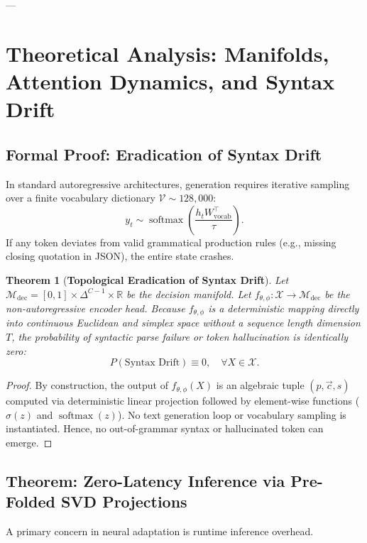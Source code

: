 \documentclass[10pt,journal,compsoc]{IEEEtran}
\newtheorem{theorem}{Theorem}
\theoremstyle{remark}
\begin{document}
---

\section{Theoretical Analysis: Manifolds, Attention Dynamics, and Syntax Drift}

\subsection{Formal Proof: Eradication of Syntax Drift}
In standard autoregressive architectures, generation requires iterative sampling over a finite vocabulary dictionary $\mathcal{V} \sim 128,000$:
\begin{equation}
y_t \sim \operatorname{softmax}\left(\frac{h_t W_{\text{vocab}}^\top}{\tau}\right).
\end{equation}
If any token deviates from valid grammatical production rules (e.g., missing closing quotation in JSON), the entire state crashes.

\begin{theorem}[\textbf{Topological Eradication of Syntax Drift}]
Let $\mathcal{M}_{\text{dec}} = [0, 1] \times \Delta^{C-1} \times \mathbb{R}$ be the decision manifold. Let $f_{\theta, \phi}: \mathcal{X} \to \mathcal{M}_{\text{dec}}$ be the non-autoregressive encoder head. Because $f_{\theta, \phi}$ is a deterministic mapping directly into continuous Euclidean and simplex space without a sequence length dimension $T$, the probability of syntactic parse failure or token hallucination is identically zero:
\begin{equation}
P(\text{Syntax Drift}) \equiv 0, \quad \forall X \in \mathcal{X}.
\end{equation}
\end{theorem}
\begin{proof}
By construction, the output of $f_{\theta, \phi}(X)$ is an algebraic tuple $(p, \vec{c}, s)$ computed via deterministic linear projection followed by element-wise functions ($\sigma(z)$ and $\operatorname{softmax}(z)$). No text generation loop or vocabulary sampling is instantiated. Hence, no out-of-grammar syntax or hallucinated token can emerge.
\end{proof}

\subsection{Theorem: Zero-Latency Inference via Pre-Folded SVD Projections}
A primary concern in neural adaptation is runtime inference overhead.
\end{document}
